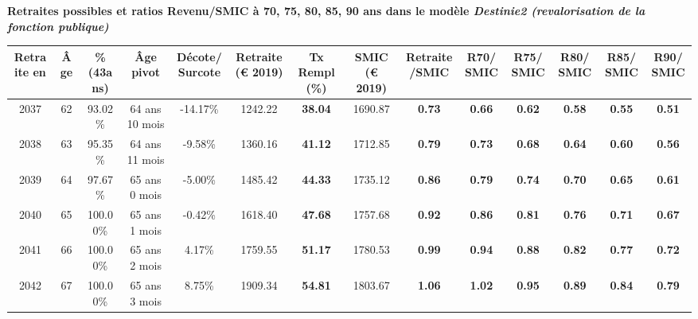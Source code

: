  \vspace{0.1cm} 
{\bf \noindent Retraites possibles et ratios Revenu/SMIC à 70, 75, 80, 85, 90 ans dans le modèle \emph{Destinie2 (revalorisation de la fonction publique)}}  
 
\begin{adjustbox}{max width=\textwidth} 
\begin{tabular}[htb]{|c|c||c|c|c||c|c||c|c||c|c|c|c|c|} 
\hline 
 Retraite en &  Âge &  \%(43ans) &  Âge pivot &  Décote/Surcote &  Retraite (\euro{} 2019) &  Tx Rempl(\%) &  SMIC (\euro{} 2019) &  Retraite/SMIC &  R70/SMIC &  R75/SMIC &  R80/SMIC &  R85/SMIC &  R90/SMIC \\ 
\hline \hline 
 2037 &  62 &  93.02\% &  64 ans 10 mois &  -14.17\% &  1242.22 &  {\bf 38.04} &  1690.87 &  {\bf {\color{red} 0.73}} &  {\bf {\color{red} 0.66}} &  {\bf {\color{red} 0.62}} &  {\bf {\color{red} 0.58}} &  {\bf {\color{red} 0.55}} &  {\bf {\color{red} 0.51}} \\ 
\hline 
 2038 &  63 &  95.35\% &  64 ans 11 mois &  -9.58\% &  1360.16 &  {\bf 41.12} &  1712.85 &  {\bf {\color{red} 0.79}} &  {\bf {\color{red} 0.73}} &  {\bf {\color{red} 0.68}} &  {\bf {\color{red} 0.64}} &  {\bf {\color{red} 0.60}} &  {\bf {\color{red} 0.56}} \\ 
\hline 
 2039 &  64 &  97.67\% &  65 ans 0 mois &  -5.00\% &  1485.42 &  {\bf 44.33} &  1735.12 &  {\bf {\color{red} 0.86}} &  {\bf {\color{red} 0.79}} &  {\bf {\color{red} 0.74}} &  {\bf {\color{red} 0.70}} &  {\bf {\color{red} 0.65}} &  {\bf {\color{red} 0.61}} \\ 
\hline 
 2040 &  65 &  100.00\% &  65 ans 1 mois &  -0.42\% &  1618.40 &  {\bf 47.68} &  1757.68 &  {\bf {\color{red} 0.92}} &  {\bf {\color{red} 0.86}} &  {\bf {\color{red} 0.81}} &  {\bf {\color{red} 0.76}} &  {\bf {\color{red} 0.71}} &  {\bf {\color{red} 0.67}} \\ 
\hline 
 2041 &  66 &  100.00\% &  65 ans 2 mois &  4.17\% &  1759.55 &  {\bf 51.17} &  1780.53 &  {\bf {\color{red} 0.99}} &  {\bf {\color{red} 0.94}} &  {\bf {\color{red} 0.88}} &  {\bf {\color{red} 0.82}} &  {\bf {\color{red} 0.77}} &  {\bf {\color{red} 0.72}} \\ 
\hline 
 2042 &  67 &  100.00\% &  65 ans 3 mois &  8.75\% &  1909.34 &  {\bf 54.81} &  1803.67 &  {\bf 1.06} &  {\bf 1.02} &  {\bf {\color{red} 0.95}} &  {\bf {\color{red} 0.89}} &  {\bf {\color{red} 0.84}} &  {\bf {\color{red} 0.79}} \\ 
\hline 
\hline 
\end{tabular} 
\end{adjustbox} 
 
